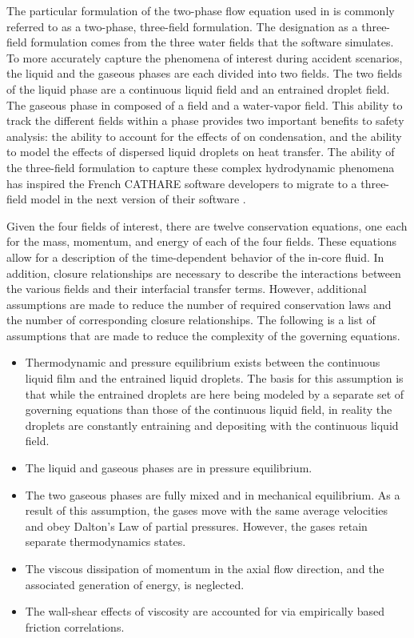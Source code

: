 The particular formulation of the two-phase flow equation used in \cobra{} is commonly referred to as a two-phase, three-field formulation.
The designation as a three-field formulation comes from the three water fields that the software simulates. 
To more accurately capture the phenomena of interest during accident scenarios, the liquid and the gaseous phases are each divided into two fields.
The two fields of the liquid phase are a continuous liquid field and an entrained droplet field.
The gaseous phase in composed of a \ncg{} field and a water-vapor field. 
This ability to track the different fields within a phase provides two important benefits to safety analysis: the ability to account for the effects of \ncgs{} on condensation, and the ability to model the effects of dispersed liquid droplets on heat transfer.
The ability of the three-field formulation to capture these complex hydrodynamic phenomena has inspired the French CATHARE software developers to migrate to a three-field model in the next version of their software \cite{Emonot2011}.

Given the four fields of interest, there are twelve conservation equations, one each for the mass, momentum, and energy of each of the four fields.
These equations allow for a description of the time-dependent behavior of the in-core fluid.
In addition, closure relationships are necessary to describe the interactions between the various fields and their interfacial transfer terms.
However, additional assumptions are made to reduce the number of required conservation laws and the number of corresponding closure relationships.
The following is a list of assumptions that are made to reduce the complexity of the governing equations.

\begin{itemize}
\item{
Thermodynamic and pressure equilibrium exists between the continuous liquid film and the entrained liquid droplets.
The basis for this assumption is that while the entrained droplets are here being modeled by a separate set of governing equations than those of the continuous liquid field, in reality the droplets are constantly entraining and depositing with the continuous liquid field. 
}
\item{
The liquid and gaseous phases are in pressure equilibrium.
}
\item{
The two gaseous phases are fully mixed and in mechanical equilibrium.
As a result of this assumption, the gases move with the same average velocities and obey Dalton's Law of partial pressures.
However, the gases retain separate thermodynamics states.
}
\item{
The viscous dissipation of momentum in the axial flow direction, and the associated generation of energy, is neglected.
}
\item{
The wall-shear effects of viscosity are accounted for via empirically based friction correlations.
}
\end{itemize}

